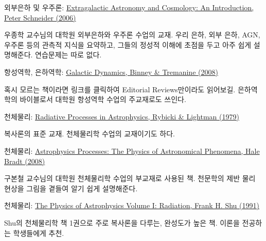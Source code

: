 \begin{packed_item}
\item 외부은하 및 우주론:
  \href{http://www.amazon.com/Extragalactic-Astronomy-Cosmology-Peter-Schneider/dp/3540331743}{Extragalactic
    Astronomy and Cosmology: An Introduction, \textsf{Peter Schneider (2006)}}
\begin{packed_item}
\item 우종학 교수님의 대학원 외부은하와 우주론 수업의 교재. 우리 은하, 외부
  은하, AGN, 우주론 등의 관측적 지식을 요약하고, 그들의 정성적 이해에 초점을 두고
  아주 쉽게 설명해준다. 연습문제는 따로 없다.
\end{packed_item}

\item 항성역학, 은하역학:
  \href{http://www.amazon.com/Galactic-Dynamics-Second-Princeton-Astrophysics/dp/0691130272}{Galactic
    Dynamics, \textsf{Binney \& Tremanine (2008)}}
\begin{packed_item}
\item 혹시 모르는 책이라면 링크를 클릭하여 Editorial Reviews만이라도
  읽어보길. 은하역학의 바이블로서 대학원 항성역학 수업의 주교재로도 쓰인다.
\end{packed_item}

\item 천체물리:
  \href{http://www.amazon.com/Radiative-Processes-Astrophysics-George-Rybicki/dp/0471827592}{Radiative
    Processes in Astrophysics, \textsf{Rybicki \& Lightman (1979)}}
\begin{packed_item}
\item 복사론의 표준 교재. 천체물리학 수업의 교재이기도 하다.
\end{packed_item}

\item 천체물리:
  \href{http://www.amazon.com/Astrophysics-Processes-Physics-Astronomical-Phenomena/dp/0521846560}{Astrophysics
    Processes: The Physics of Astronomical Phenomena, \textsf{Hale Bradt
      (2008)}}
\begin{packed_item}
\item 구본철 교수님의 대학원 천체물리학 수업의 부교재로 사용된 책. 천문학의 제반
  물리 현상을 그림을 곁들여 알기 쉽게 설명해준다.
\end{packed_item}

\item 천체물리:
  \href{http://www.amazon.com/Physics-Astrophysics-I-Radiation/dp/0935702644}{The
    Physics of Astrophysics Volume I: Radiation, \textsf{Frank H. Shu (1991)}}
\begin{packed_item}
\item Shu의 천체물리학 책 1권으로 주로 복사론을 다루는, 완성도가 높은 책. 이론을
  전공하는 학생들에게 추천.
\end{packed_item}


\end{packed_item}

